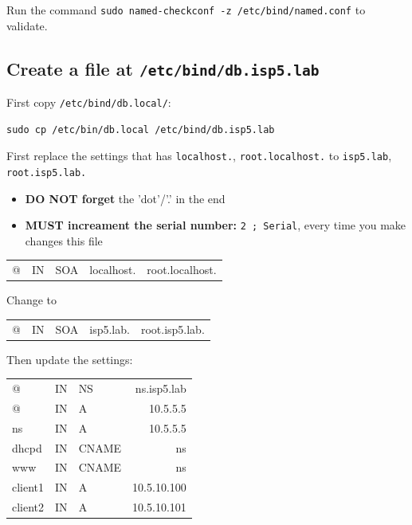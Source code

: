 \documentclass[11pt]{article}
\begin{document}
Run the command \texttt{sudo named-checkconf -z /etc/bind/named.conf} to validate.

\subsection{Create a file at \texttt{/etc/bind/db.isp5.lab}}
\label{sec:org4443ebe}

First copy \texttt{/etc/bind/db.local/}:

\begin{verbatim}
sudo cp /etc/bin/db.local /etc/bind/db.isp5.lab
\end{verbatim}

First replace the settings that has  \texttt{localhost.}, \texttt{root.localhost.} to \texttt{isp5.lab}, \texttt{root.isp5.lab.}

\begin{itemize}
\item \textbf{DO NOT forget} the 'dot'/'.' in the end
\item \textbf{MUST increament the serial number:} \texttt{2     ; Serial}, every time you make changes this file
\end{itemize}

\begin{center}
\begin{tabular}{lllll}
@ & IN & SOA & localhost. & root.localhost.\\
\end{tabular}
\end{center}
Change to
\begin{center}
\begin{tabular}{lllll}
@ & IN & SOA & isp5.lab. & root.isp5.lab.\\
\end{tabular}
\end{center}

Then update the settings:

\begin{center}
\begin{tabular}{lllr}
@ & IN & NS & ns.isp5.lab\\
@ & IN & A & 10.5.5.5\\
ns & IN & A & 10.5.5.5\\
dhcpd & IN & CNAME & ns\\
www & IN & CNAME & ns\\
client1 & IN & A & 10.5.10.100\\
client2 & IN & A & 10.5.10.101\\
\end{tabular}
\end{center}
\end{document}
